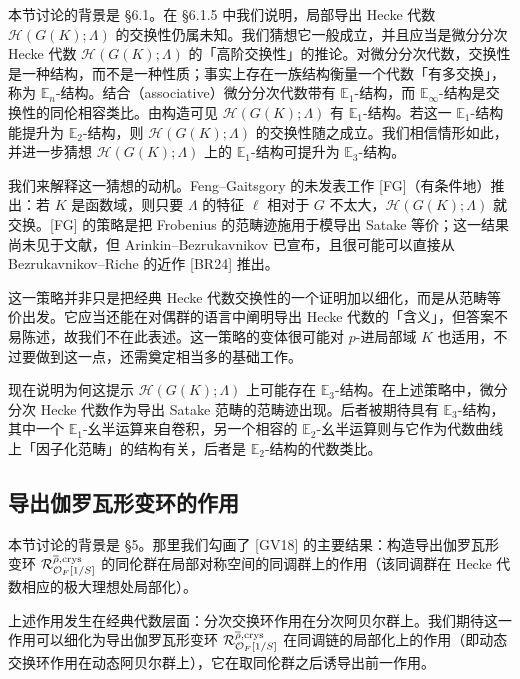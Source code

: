 本节讨论的背景是 §6.1。在 §6.1.5 中我们说明，局部导出 Hecke 代数 $\mathcal H(G(K);\Lambda)$ 的交换性仍属未知。我们猜想它一般成立，并且应当是微分分次 Hecke 代数 $\mathscr H(G(K);\Lambda)$ 的「高阶交换性」的推论。对微分分次代数，交换性是一种结构，而不是一种性质；事实上存在一族结构衡量一个代数「有多交换」，称为 $\mathbb E_n$-结构。结合（associative）微分分次代数带有 $\mathbb E_1$-结构，而 $\mathbb E_\infty$-结构是交换性的同伦相容类比。由构造可见 $\mathscr H(G(K);\Lambda)$ 有 $\mathbb E_1$-结构。若这一 $\mathbb E_1$-结构能提升为 $\mathbb E_2$-结构，则 $\mathcal H(G(K);\Lambda)$ 的交换性随之成立。我们相信情形如此，并进一步猜想 $\mathscr H(G(K);\Lambda)$ 上的 $\mathbb E_1$-结构可提升为 $\mathbb E_3$-结构。

我们来解释这一猜想的动机。Feng–Gaitsgory 的未发表工作 [FG]（有条件地）推出：若 $K$ 是函数域，则只要 $\Lambda$ 的特征 $\ell$ 相对于 $G$ 不太大，$\mathcal H(G(K);\Lambda)$ 就交换。[FG] 的策略是把 Frobenius 的范畴迹施用于模导出 Satake 等价；这一结果尚未见于文献，但 Arinkin–Bezrukavnikov 已宣布，且很可能可以直接从 Bezrukavnikov–Riche 的近作 [BR24] 推出。

这一策略并非只是把经典 Hecke 代数交换性的一个证明加以细化，而是从范畴等价出发。它应当还能在对偶群的语言中阐明导出 Hecke 代数的「含义」，但答案不易陈述，故我们不在此表述。这一策略的变体很可能对 $p$-进局部域 $K$ 也适用，不过要做到这一点，还需奠定相当多的基础工作。

现在说明为何这提示 $\mathscr H(G(K);\Lambda)$ 上可能存在 $\mathbb E_3$-结构。在上述策略中，微分分次 Hecke 代数作为导出 Satake 范畴的范畴迹出现。后者被期待具有 $\mathbb E_3$-结构，其中一个 $\mathbb E_1$-幺半运算来自卷积，另一个相容的 $\mathbb E_2$-幺半运算则与它作为代数曲线上「因子化范畴」的结构有关，后者是 $\mathbb E_2$-结构的代数类比。

\subsection{导出伽罗瓦形变环的作用}

本节讨论的背景是 §5。那里我们勾画了 [GV18] 的主要结果：构造导出伽罗瓦形变环 $\mathcal R^{\overline\rho,\mathrm{crys}}_{\mathcal{O}_F[1/S]}$ 的同伦群在局部对称空间的同调群上的作用（该同调群在 Hecke 代数相应的极大理想处局部化）。

上述作用发生在经典代数层面：分次交换环作用在分次阿贝尔群上。我们期待这一作用可以细化为导出伽罗瓦形变环 $\mathcal R^{\overline\rho,\mathrm{crys}}_{\mathcal{O}_F[1/S]}$ 在同调链的局部化上的作用（即动态交换环作用在动态阿贝尔群上），它在取同伦群之后诱导出前一作用。

